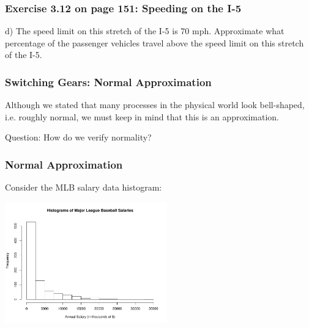 \documentclass[handout]{beamer}
\newcommand{\blue}[1]{\textcolor{blue2}{#1}}
\begin{document}
\begin{frame}
\frametitle{Exercise 3.12 on page 151: Speeding on the I-5}
d) The speed limit on this stretch of the I-5 is 70 mph. Approximate what percentage of
the passenger vehicles travel above the speed limit on this stretch of the I-5.

\vspace{7cm}

\end{frame}


\begin{frame}
\frametitle{Switching Gears: Normal Approximation}

Although we stated that many processes in the physical world look bell-shaped, i.e. roughly normal, we must keep in mind that this is an \blue{approximation}.  

\vspace{0.5cm}

\pause\blue{Question}: How do we verify normality?

\end{frame}


\begin{frame}
\frametitle{Normal Approximation}

Consider the MLB salary data histogram:

\begin{center}
\includegraphics[width=7cm]{figure/MLB.pdf}
\end{center}

\end{frame}
\end{document}
